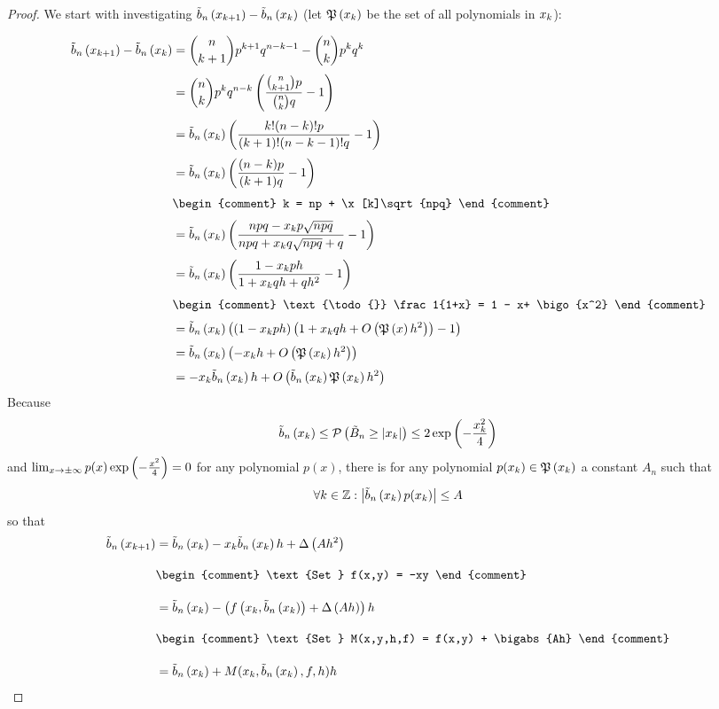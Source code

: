 
\newcommand*{\knp}{\tilde k}
\newcommand*{\xnp}{\x[\knp]}
\newcommand*{\phin}[2][n]{y_{#1}\left({#2}\right)}
\newcommand*{\dphin}[2][n]{y_{#1}'\left({#2}\right)}

\begin{proof}
  We start with investigating $\bb{\x[k+1]}-\bb{\x[k]}$ (let $\pol{\x}$ be the set of all polynomials in $\x$):

  \begin{align}
    \bb{\x[k+1]} - \bb{\x[k]} &= \binom n{k+1} p^{k+1}q^{n-k-1} - \binom nk p^k q^k \nl
    &= \binom nk p^k q^{n-k} \br{\frac{\binom n{k+1}p}{\binom nk q} -1} \nl
    &= \bb{\x[k]} \br{\frac{k! (n-k)! p}{(k+1)!(n-k-1)! q} -1} \nl
    &= \bb{\x[k]} \br{\frac{(n-k)p}{(k+1)q}-1} \nl
    &
    \begin{comment}
      k = np + \x[k]\sqrt{npq}
    \end{comment} \nl
    &= \bb{\x[k]} \br{\frac{npq-\x[k]p\sqrt{npq}}{npq + \x[k]q\sqrt{npq}+q}-1} \nl
    &= \bb{\x[k]} \br{\frac{1-\x[k]ph}{1+\x[k]qh+qh^2}-1} \nl
    &
    \begin{comment}
      \text{\todo{}} \frac1{1+x} = 1 - x+ \bigo{x^2}
    \end{comment} \nl
    &= \bb{\x[k]} \br{\br{1-\x[k]ph}\br{1+\x[k]qh + \bigo{\pol{x}h^2}}-1} \nl
    &= \bb{\x[k]} \br{-\x[k]h + \bigo{\pol{\x}h^2}} \nl
    &= -\x[k]\bb{\x}h + \bigo{\bb{\x}\pol{\x}h^2}
  \end{align}
  Because 
  \begin{align}
    \bb{\x} \le \P{\BBs \ge \abs{x_k}} \le 2\fexp{-\frac{\x^2}4}
  \end{align}
  and $\lim_{x\to\pm\infty} p(x)\fexp{-\frac{x^2}4}=0$ for any polynomial $p(x)$, there is for any polynomial $p(\x)\in\pol{\x}$ a constant $A_n$ such that
  \begin{align}
    \forall k\in\Z: \abs{\bb{\x}p(\x)} \le A
  \end{align}
  so that
  \begin{align}
    \bb{\x[k+1]} &= \bb{\x[k]} -\x[k]\bb{\x[k]} h + \bigabs{A h^2} \bnl
    &
    \begin{comment}
      \text{Set } f(x,y) = -xy
    \end{comment} \bnl
    &= \bb{\x[k]} - \br{\f{\x[k], \bb{\x[k]}} + \bigabs{A h}}h \bnl
    &
    \begin{comment}
      \text{Set } M(x,y,h,f) = f(x,y) + \bigabs{Ah}
    \end{comment} \bnl
    &= \bb{\x[k]} + M(\x[k], \bb{\x[k]}, f, h) h
  \end{align}


\end{proof}
